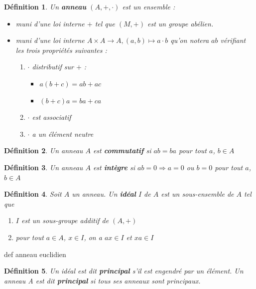 \documentclass[a4paper,12pt]{report}  %
\theoremstyle{definitionstyle}
\newtheorem{definition}{Définition}[chapter] %
\theoremstyle{examplestyle}
\theoremstyle{remarkstyle}
\theoremstyle{propositionstyle}
\theoremstyle{theoremstyle}
\theoremstyle{proofstyle}
\begin{document}
	\begin{definition}
		Un \textbf{anneau} $(A, +, \cdot)$ est un ensemble : 
		\begin{itemize}
			\item muni d'une loi interne $+$ tel que $(M, +)$ est un groupe abélien.
			\item muni d'une loi interne $A \times A \rightarrow A, (a, b) \mapsto a \cdot b$ qu'on notera $ab$ vérifiant les trois propriétés suivantes :
			
			\begin{enumerate}
				\item $\cdot$ distributif sur $+$ :
					\begin{itemize}
						\item $a(b + c) = ab + ac$
						\item $(b+c)a = ba+ca$
					\end{itemize}
				
				
				\item $\cdot$ est associatif
				
				\item $\cdot$ a un élément neutre
			\end{enumerate}
		\end{itemize}
	\end{definition}

	\begin{definition}
		Un anneau $A$ est \textbf{commutatif} si $ab = ba$ pour tout $a$, $b \in A$
	\end{definition}
	
	\begin{definition}
		Un anneau $A$ est \textbf{intègre} si $ab=0 \Rightarrow a = 0$ ou $b = 0$ pour tout $a$, $b \in A$
	\end{definition}

	\begin{definition}
		Soit $A$ un anneau. Un \textbf{idéal} $I$ de $A$ est un sous-ensemble de $A$ tel que
		\begin{enumerate}
			\item $I$ est un sous-groupe additif de $(A, +)$
			\item pour tout $a \in A$, $x \in I$, on a $ax \in I$ et $xa \in I$
		\end{enumerate}
	\end{definition}

	def anneau euclidien
	
	\begin{definition}
		Un idéal est dit \textbf{principal} s'il est engendré par un élément. Un anneau A est dit \textbf{principal} si tous ses anneaux sont principaux.
	\end{definition} 
	
\end{document}
